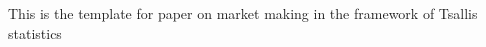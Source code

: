 \documentclass[a4paper, 12pt]{article}
\begin{document}
    This is the template for paper on market making in the framework of Tsallis statistics
\end{document}
